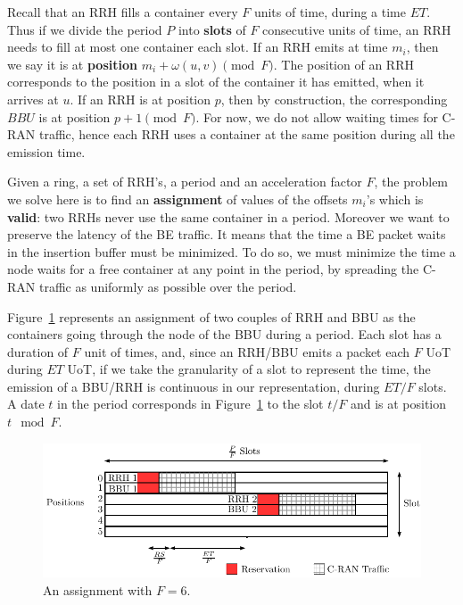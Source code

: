 \documentclass[10pt, conference, letterpaper]{IEEEtran}
\begin{document}
Recall that an RRH fills a container every $F$ units of time, during a time $ET$. 
Thus if we divide the period $P$ into \textbf{slots} of $F$ consecutive units of time, an RRH needs to fill at most one container each slot. If an RRH emits at time $m_i$, then we say it is at \textbf{position} $m_i + \omega(u,v)\pmod F$.
The position of an RRH corresponds to the position in a slot of the container it has emitted, when it arrives at $u$. 
If an RRH is at position $p$, then by construction, the corresponding $BBU$ is at position $p+1\pmod F$. For now, we do not allow waiting times for C-RAN traffic, hence each RRH uses a container at the same position during all the emission time. 

Given a ring, a set of RRH's, a period and an acceleration factor $F$, the problem we solve here is to find an \textbf{assignment} of values of the offsets $m_i$'s which is \textbf{valid}: two RRHs never use the same container in a period. Moreover we want to preserve the latency of the BE traffic. It means that the time a BE packet waits in the insertion buffer must be minimized. To do so, we must minimize the time a node waits for a free container at any point in the period, by spreading the C-RAN traffic as uniformly as possible over the period. %

Figure~\ref{fig:assignment} represents an assignment of two couples of RRH and BBU as the containers going through the node of the BBU during a period. Each slot has a duration of $F$ unit of times, and, since an RRH/BBU emits a packet each $F$ UoT during $ET$ UoT, if we take the granularity of a slot to represent the time, the emission of a BBU/RRH is continuous in our representation, during $ET/F$ slots. A date $t$ in the period corresponds in Figure~\ref{fig:assignment} to the slot $t/F$ and is at position $t \mod F$.


\begin{figure}[h!]
\begin{center}   

      \includegraphics[scale=0.65]{assignment}
     \caption{An assignment with $F = 6$.}\label{fig:assignment}
     
\end{center}
  \end{figure}
\end{document}
